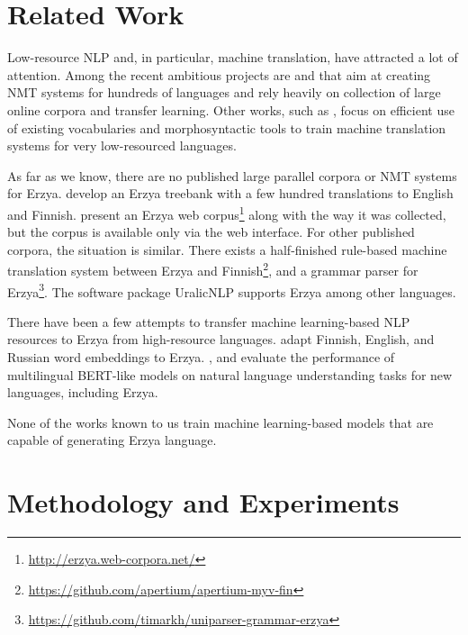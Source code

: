 \documentclass[11pt]{article}
\begin{document}
\section{Related Work}
Low-resource NLP and, in particular, machine translation, have attracted a lot of attention. Among the recent ambitious projects are \citet{bapna2022building} and \citet{nllb2022} that aim at creating NMT systems for hundreds of languages and rely heavily on collection of large online corpora and transfer learning. Other works, such as \citet{hamalainen2019template}, focus on efficient use of existing vocabularies and morphosyntactic tools to train machine translation systems for very low-resourced languages.

As far as we know, there are no published large parallel corpora or NMT systems for Erzya. \citet{rueter-tyers-2018-towards} develop an Erzya treebank with a few hundred translations to English and Finnish. \citet{arkhangelsky2019} present an Erzya web corpus\footnote{\url{http://erzya.web-corpora.net/}} along with the way it was collected, but the corpus is available only via the web interface. For other published corpora, the situation is similar. There exists a half-finished rule-based machine translation system between Erzya and Finnish\footnote{\url{https://github.com/apertium/apertium-myv-fin}}, and a grammar parser for Erzya\footnote{\url{https://github.com/timarkh/uniparser-grammar-erzya}}. The software package UralicNLP \cite{uralicnlp_2019} supports Erzya among other languages.

There have been a few attempts to transfer machine learning-based NLP resources to Erzya from high-resource languages. \citet{alnajjar2021word} adapt Finnish, English, and Russian word embeddings to Erzya. 
\citet{muller-etal-2021-unseen}, \citet{acs-etal-2021-evaluating} and \citet{wang-etal-2022-expanding} evaluate the performance of multilingual BERT-like models on natural language understanding tasks for new languages, including Erzya. 

None of the works known to us train machine learning-based models that are capable of generating Erzya language.


\section{Methodology and Experiments}
\end{document}
